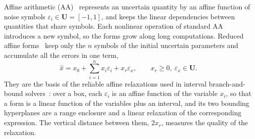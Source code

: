 \documentclass[10pt]{article}
\theoremstyle{definition}
\newcommand{\U}{\mathbf{U}}
\newcommand{\eps}{\varepsilon}
\newcommand{\ex}{\eps_x}
\begin{document}
Affine arithmetic (AA)~\cite{combastolfi1993,stolfi1997self,defigueiredo2004affine} represents an uncertain quantity by an affine function of noise symbols $\eps_i\in\U=[-1,1]$, and keeps the linear dependencies between quantities that share symbols. Each nonlinear operation of standard AA introduces a new symbol, so the forms grow along long computations. Reduced affine forms~\cite{messine2002extentions,vu2009enhancing,skalna2017new} keep only the $n$ symbols of the initial uncertain parameters and accumulate all the errors in one term,
\begin{equation}
\label{eq:raf}
\hat x = x_0 + \sum_{i=1}^n x_i\eps_i + x_r\ex,\qquad x_r\ge 0,\ \ex\in\U .
\end{equation}
They are the basis of the reliable affine relaxations used in interval branch-and-bound solvers~\cite{ninin2015reliable}: over a box, each $\eps_i$ is an affine function of the variable $x_i$, so that a form is a linear function of the variables plus an interval, and its two bounding hyperplanes are a range enclosure and a linear relaxation of the corresponding expression. The vertical distance between them, $2x_r$, measures the quality of the relaxation.
\end{document}
